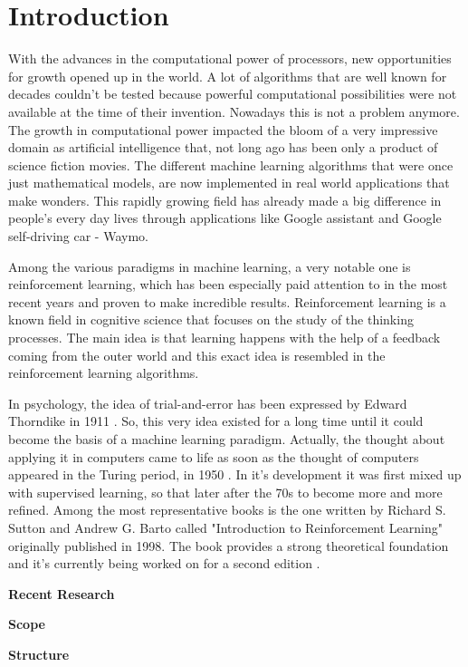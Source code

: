 \chapter{Introduction}
With the advances in the computational power of processors, new opportunities for growth opened up in the world. A lot of algorithms that are well known for decades couldn't be tested because powerful computational possibilities were not available at the time of their invention. Nowadays this is not a problem anymore. The growth in computational power impacted the bloom of a very impressive domain as artificial intelligence that, not long ago has been only a product of science fiction movies. The different machine learning algorithms that were once just mathematical models, are now implemented in real world applications that make wonders. This rapidly growing field has already made a big difference in people's every day lives through applications like Google assistant and Google self-driving car - Waymo.

Among the various paradigms in machine learning, a very notable one is reinforcement learning, which has been especially paid attention to in the most recent years and proven to make incredible results. Reinforcement learning is a known field in cognitive science that focuses on the study of the thinking processes. The main idea is that learning happens with the help of a feedback coming from the outer world and this exact idea is resembled in the reinforcement learning algorithms. 

In psychology, the idea of trial-and-error has been expressed by Edward Thorndike in 1911 \cite{Sutton:1998:IRL:551283}. So, this very idea existed for a long time until it could become the basis of a machine learning paradigm. Actually, the thought about applying it in computers came to life as soon as the thought of computers appeared in the Turing period, in 1950 \cite{Sutton:1998:IRL:551283}. In it's development it was first mixed up with supervised learning, so that later after the 70s to become more and more refined. Among the most representative books is the one written by Richard S. Sutton and Andrew G. Barto called "Introduction to Reinforcement Learning" \cite{Sutton:1998:IRL:551283} originally published in 1998. The book \cite{Sutton:1998:IRL:551283} provides a strong theoretical foundation and it's currently being worked on for a second edition \cite{Sutton}.

\textbf{Recent Research}

\textbf{Scope}

\textbf{Structure}
